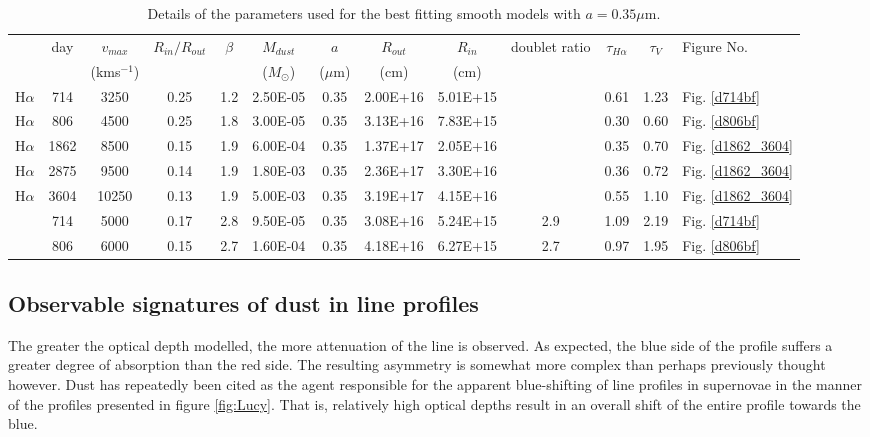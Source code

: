 \documentclass[useAMS,usenatbib,usegraphicx]{mnras}
\begin{document}
\begin{table}
	\begin{minipage}{180mm}
	\caption{Details of the parameters used for the best fitting smooth models with $a=0.35\mu$m.}
	\label{smooth1}
	\begin{center}
  	\begin{tabular}{@{} ccccccccccccl @{}}
    	\hline
 & day & $v_{max}$ & $R_{in}/R_{out}$ & $\beta$ & $M_{dust}$ & $a$ & $R_{out}$ & $R_{in}$ & doublet ratio & $\tau_{H\alpha}$ & $\tau_V$  & Figure No. \\
	&& (kms$^{-1} $) & & & ($M_{\odot}$) & ($\mu$m) & (cm) & (cm)  \\
	\hline
H$\alpha$ & 714 & 3250 & 0.25 & 1.2 & 2.50E-05 & 0.35 & 2.00E+16 & 5.01E+15 & & 0.61 & 1.23 &  Fig. \ref{d714bf}\\
H$\alpha$ & 806 & 4500 & 0.25 & 1.8 & 3.00E-05 & 0.35 & 3.13E+16 & 7.83E+15 & & 0.30 & 0.60 &  Fig. \ref{d806bf}\\
H$\alpha$ & 1862 & 8500 & 0.15 & 1.9 & 6.00E-04 & 0.35 & 1.37E+17 & 2.05E+16 & & 0.35 & 0.70 &  Fig. \ref{d1862_3604}\\
H$\alpha$ & 2875 & 9500 & 0.14 & 1.9 & 1.80E-03 & 0.35 & 2.36E+17 & 3.30E+16 & & 0.36 & 0.72 &  Fig. \ref{d1862_3604}\\
H$\alpha$ & 3604 & 10250 & 0.13 & 1.9 & 5.00E-03 & 0.35 & 3.19E+17 & 4.15E+16 & & 0.55 & 1.10 &  Fig. \ref{d1862_3604}\\ \relax
[OI] & 714 & 5000 & 0.17 & 2.8 & 9.50E-05 & 0.35 & 3.08E+16 & 5.24E+15 & 2.9 & 1.09 & 2.19 & Fig. \ref{d714bf}\\ \relax
[OI] & 806 & 6000 & 0.15 & 2.7 & 1.60E-04 & 0.35 & 4.18E+16 & 6.27E+15 & 2.7 & 0.97 & 1.95 & Fig. \ref{d806bf} \\
    \hline
  \end{tabular}
  \end{center}
\end{minipage}
\end{table}


\subsection{Observable signatures of dust in line profiles}
\label{asym}
The greater the optical depth modelled, the more attenuation of the line is observed.  As expected, the blue side of the profile suffers a greater degree of absorption than the red side.  The resulting asymmetry is somewhat more complex than perhaps previously thought however.  Dust has repeatedly been cited as the agent responsible for the apparent blue-shifting of line profiles in supernovae in the manner of the profiles presented in figure \ref{fig:Lucy}.  That is, relatively high optical depths result in an overall shift of the entire profile towards the blue.
\end{document}
